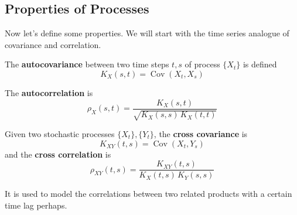 \documentclass{article}
\DeclareMathOperator{\Cov}{Cov}
\begin{document}
  \subsection{Properties of Processes}

    Now let's define some properties. We will start with the time series analogue of covariance and correlation. 

    \begin{definition}[Autocovariance]
      The \textbf{autocovariance} between two time steps $t, s$ of process $\{X_t\}$ is defined 
      \begin{equation}
        K_X (s, t) = \Cov(X_t, X_s)
      \end{equation}
    \end{definition}

    \begin{definition}[Autocorrelation]
      The \textbf{autocorrelation} is 
      \begin{equation}
        \rho_X (s, t) = \frac{K_X (s, t)}{\sqrt{K_X (s, s) \, K_X (t, t)}}
      \end{equation}
    \end{definition}

    \begin{definition}
      Given two stochastic processes $\{X_t\}, \{Y_t\}$, the \textbf{cross covariance} is 
      \begin{equation}
        K_{XY} (t, s) = \Cov(X_t, Y_s)
      \end{equation}
      and the \textbf{cross correlation} is 
      \begin{equation}
        \rho_{XY} (t, s) = \frac{K_{XY}(t, s)}{K_X (t, s) \, K_Y(s, s)}
      \end{equation}

      It is used to model the correlations between two related products with a certain time lag perhaps.  
    \end{definition}
\end{document}
